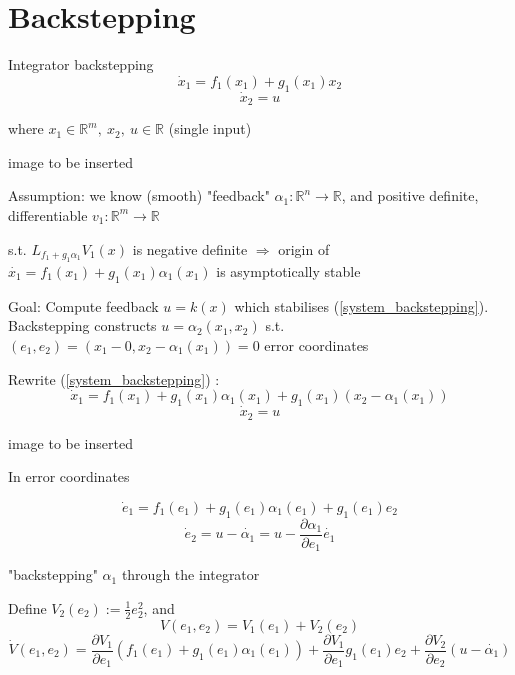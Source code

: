 \section{Backstepping}

Integrator backstepping 
\begin{equation}\label{system_backstepping}
\dot x_1 = f_1(x_1) + g_1(x_1)x_2 
\end{equation}
\begin{equation*}
\dot x_2 = u
\end{equation*}

where $x_1 \in \mathbb{R}^m, \ x_2, \ u \in \mathbb{R}$ (single input)

image to be inserted

Assumption: we know (smooth) "feedback" $\alpha_1: \mathbb{R}^n \to \mathbb{R}$, and positive definite, differentiable $v_1: \mathbb{R}^m \to \mathbb{R}$

s.t. $L_{f_1 + g_1\alpha_1}V_1(x)$ is negative definite $\Rightarrow$ origin of $\dot{x_1} = f_1(x_1) + g_1(x_1)\alpha_1(x_1)$ is asymptotically stable

Goal: Compute feedback $u = k(x)$ which stabilises (\ref{system_backstepping}). Backstepping constructs $u = \alpha_2(x_1, x_2)$ s.t. $(e_1, e_2) = (x_1 - 0, x_2 - \alpha_1(x_1))=0$ error coordinates

Rewrite (\ref{system_backstepping}) :
\begin{equation*}
\dot x_1 = f_1(x_1) + g_1(x_1)\alpha_1(x_1) + g_1(x_1)(x_2 - \alpha_1(x_1))
\end{equation*}  
\begin{equation*}
\dot x_2 = u
\end{equation*}

image to be inserted

In error coordinates

\begin{equation}\label{error_coordinates_rewriting}
\dot e_1 = f_1(e_1) + g_1(e_1)\alpha_1(e_1) +g_1(e_1)e_2
\end{equation}
\begin{equation*}
\dot e_2 = u - \dot{\alpha_1} = u - \frac{\partial \alpha_1}{\partial e_1}\dot{e_1} 
\end{equation*}

"backstepping" $\alpha_1$ through the integrator

Define $V_2(e_2):= \frac{1}{2} e_2^2$, and 
\begin{equation*}
V(e_1, e_2) = V_1(e_1) + V_2(e_2)
\end{equation*}  
\begin{equation*}
\dot V(e_1, e_2) = \frac{\partial V_1}{\partial e_1}(f_1(e_1) + g_1(e_1)\alpha_1(e_1)) + \frac{\partial V_1}{\partial e_1}g_1(e_1)e_2 + \frac{\partial V_2}{\partial e_2}(u - \dot{\alpha_1})
\end{equation*}

